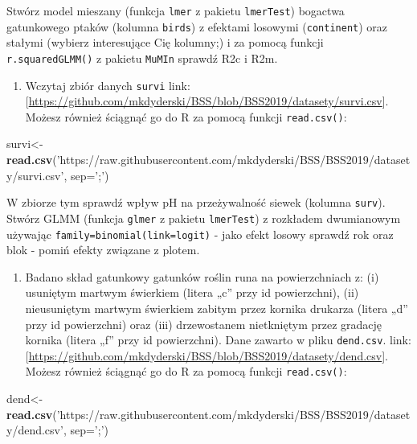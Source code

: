 \documentclass[]{article}
\newenvironment{Shaded}{\begin{snugshade}}{\end{snugshade}}
\newcommand{\KeywordTok}[1]{\textcolor[rgb]{0.13,0.29,0.53}{\textbf{#1}}}
\newcommand{\DataTypeTok}[1]{\textcolor[rgb]{0.13,0.29,0.53}{#1}}
\newcommand{\StringTok}[1]{\textcolor[rgb]{0.31,0.60,0.02}{#1}}
\newcommand{\NormalTok}[1]{#1}
\providecommand{\tightlist}{%
  \setlength{\itemsep}{0pt}\setlength{\parskip}{0pt}}
\begin{document}
Stwórz model mieszany (funkcja \texttt{lmer} z pakietu
\texttt{lmerTest}) bogactwa gatunkowego ptaków (kolumna \texttt{birds})
z efektami losowymi (\texttt{continent}) oraz stałymi (wybierz
interesujące Cię kolumny;) i za pomocą funkcji \texttt{r.squaredGLMM()}
z pakietu \texttt{MuMIn} sprawdź R2c i R2m.

\begin{enumerate}
\def\labelenumi{\arabic{enumi}.}
\setcounter{enumi}{4}
\tightlist
\item
  Wczytaj zbiór danych \texttt{survi} link:
  {[}\url{https://github.com/mkdyderski/BSS/blob/BSS2019/datasety/survi.csv}{]}.
  Możesz również ściągnąć go do R za pomocą funkcji \texttt{read.csv()}:
\end{enumerate}

\begin{Shaded}
\begin{Highlighting}[]
\NormalTok{survi<-}\KeywordTok{read.csv}\NormalTok{(}\StringTok{'https://raw.githubusercontent.com/mkdyderski/BSS/BSS2019/datasety/survi.csv'}\NormalTok{,}
                \DataTypeTok{sep=}\StringTok{';'}\NormalTok{)}
\end{Highlighting}
\end{Shaded}

W zbiorze tym sprawdź wpływ pH na przeżywalność siewek (kolumna
\texttt{surv}). Stwórz GLMM (funkcja \texttt{glmer} z pakietu
\texttt{lmerTest}) z rozkładem dwumianowym używając
\texttt{family=binomial(link=\textquotesingle{}logit\textquotesingle{})}
- jako efekt losowy sprawdź rok oraz blok - pomiń efekty związane z
plotem.

\begin{enumerate}
\def\labelenumi{\arabic{enumi}.}
\setcounter{enumi}{5}
\tightlist
\item
  Badano skład gatunkowy gatunków roślin runa na powierzchniach z: (i)
  usuniętym martwym świerkiem (litera „c'' przy id powierzchni), (ii)
  nieusuniętym martwym świerkiem zabitym przez kornika drukarza (litera
  „d'' przy id powierzchni) oraz (iii) drzewostanem nietkniętym przez
  gradację kornika (litera „f'' przy id powierzchni). Dane zawarto w
  pliku \texttt{dend.csv}. link:
  {[}\url{https://github.com/mkdyderski/BSS/blob/BSS2019/datasety/dend.csv}{]}.
  Możesz również ściągnąć go do R za pomocą funkcji \texttt{read.csv()}:
\end{enumerate}

\begin{Shaded}
\begin{Highlighting}[]
\NormalTok{dend<-}\KeywordTok{read.csv}\NormalTok{(}\StringTok{'https://raw.githubusercontent.com/mkdyderski/BSS/BSS2019/datasety/dend.csv'}\NormalTok{,}
                 \DataTypeTok{sep=}\StringTok{';'}\NormalTok{)}
\end{Highlighting}
\end{Shaded}
\end{document}

